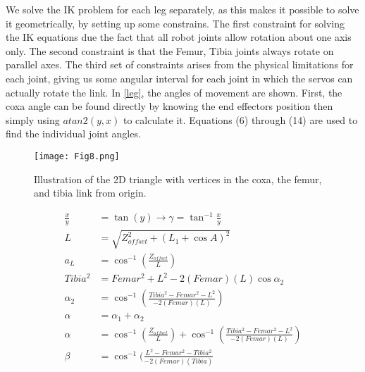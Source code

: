 We solve the IK problem for each leg separately, as this makes it possible to solve it geometrically, by setting up some constrains. The first constraint for solving the IK equations due the fact that all robot joints allow rotation about one axis only. The second constraint is that the Femur, Tibia joints always rotate on parallel axes. The third set of constraints arises from the physical limitations for each joint, giving us some angular interval for each joint in which the servos can actually rotate the link. In \ref{leg}, the angles of movement are shown.
First, the coxa angle can be found directly by knowing the end effectors position then simply using $atan2(y,x)$ to calculate it. Equations (6) through (14) are used to find the individual joint angles.
\begin{figure}[h]
	\centering
	\texttt{[image: Fig8.png]}
	\caption{ Illustration of the 2D triangle with vertices in the coxa, the femur, and tibia link from origin.}
	\label{fig8}
\end{figure}

\begin{align}
    \frac{x}{y} & =\tan (y)\to \gamma =\tan ^{-1}\frac{x}{y} \\
    L              & = \sqrt{Z_{offset}^{2}+(L_{1}+\cos A)^{2}}\\
    a_{L}        & = \cos ^{-1}(\frac{Z_{offset}}{L})\\
    Tibia^{2}  & =Femar^{2}+L^{2}-2(Femar)(L)\cos \alpha _{2} \\
    \alpha _{2} & =\cos^{-1}(\frac{Tibia^{2}-Femar^{2}-L^{2}}{-2(Femar)(L)}) \\
    \alpha      & =\alpha _{1}+\alpha _{2}\\
    \alpha      & = \cos ^{-1}(\frac{Z_{offset}}{L})+\cos ^{-1}(\frac{Tibia^{2}-Femar^{2}-L^{2}}{-2(Femar)(L)}) \\
    \beta        & = \cos^{-1}(\frac{L^{2}-Femar^{2}-Tibia^{2}}{-2(Femar)(Tibia)}
\end{align}